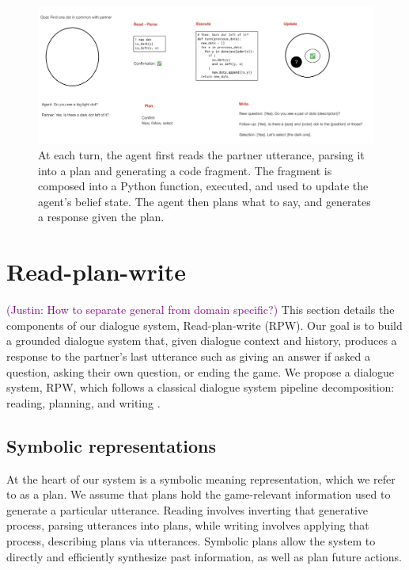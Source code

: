 \documentclass[11pt]{article}
\newcommand{\system}{RPW}
\newcommand{\justin}[1]{{{\textcolor{purple}{(Justin: #1)}}}}
\newcommand{\daniel}[1]{{{\textcolor{brown}{(Daniel: #1)}}}}
\begin{document}
\begin{figure}[t]
\centering
\includegraphics[width=2\columnwidth]{imgs/Onecommon System horizontal.png}
\caption{\label{fig:system}
At each turn, the agent first reads the partner utterance, parsing it into a plan
and generating a code fragment.
The fragment is composed into a Python function, executed, 
and used to update the agent's belief state.
The agent then plans what to say, and generates a response given the plan.
}
\end{figure}

\section{Read-plan-write}
\justin{How to separate general from domain specific?}
This section details the components of our dialogue system, Read-plan-write (\system{}).
Our goal is to build a grounded dialogue system that,
given dialogue context and history,
produces a response to the partner's last utterance
such as giving an answer if asked a question,
asking their own question, or ending the game.
We propose a dialogue system, \system{},
which follows a classical dialogue system pipeline decomposition:
reading, planning, and writing \citep{young2006pomdp,young2013pomdpsurvey,he2018dnd}.

\subsection{Symbolic representations}
At the heart of our system is a symbolic meaning representation, which we refer to as a plan.
We assume that plans hold the game-relevant information used to generate a particular utterance. Reading involves inverting that generative process, parsing utterances into plans, while writing involves applying that process, describing plans via utterances.
Symbolic plans allow the system to
directly and efficiently synthesize past information,
as well as plan future actions.
\end{document}
